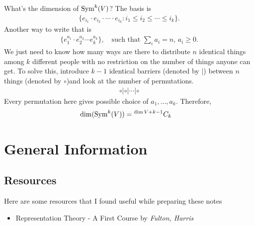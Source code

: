 What's the dimension of $\operatorname{Sym}^k(V)$? The basis is
\begin{align}
    \{e_{i_1}\cdot e_{i_2} \cdot\cdots \cdot e_{i_k} : i_1 \leq i_2 \leq \cdots \leq i_k \}.
\end{align}
Another way to write that is
\begin{align}
    \{e_1^{a_1}\cdot e_2^{a_2} \cdots e_k^{a_k}\},\quad\text{such that } \sum_i a_i = n,\, a_i\geq 0.
\end{align}
We just need to know how many ways are there to distribute $n$ identical things among $k$ different people with no restriction on the number of things anyone can get. To solve this, introduce $k-1$ identical barriers (denoted by $|$) between $n$ things (denoted by $\circ$)and look at the number of permutations.
\begin{align}
    \circ | \circ | \cdots | \circ
\end{align}
Every permutation here gives possible choice of ${a_1,\dotsc,a_k}$. Therefore,
\begin{align}
    \dim (\operatorname{Sym}^k (V)) &= {}^{\dim V +k-1}C_{k}
    \label{eqn:dim_symmetricpower}
\end{align}


\chapter{General Information}

\section{Resources}
\label{sec:Resources}
Here are some resources that I found useful while preparing these notes
\begin{itemize}
    \item Representation Theory - A First Course by \emph{Fulton, Harris}
\end{itemize}


\nocite{*} %
\printbibliography


